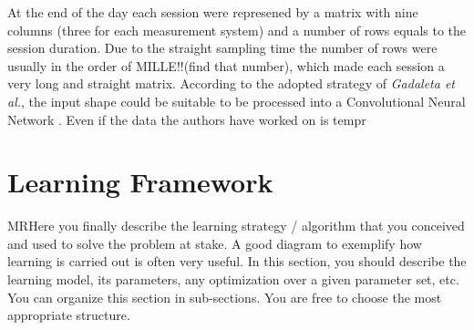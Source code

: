 At the end of the day each session were represened by a matrix with nine columns (three for each measurement system) and a number of rows equals to the session duration. Due to the straight sampling time the number of rows were usually in the order of MILLE!!(find that number), which made each session a very long and straight matrix. According to the adopted strategy of \textit{Gadaleta et al.}, the input shape could be suitable to be processed into a Convolutional Neural Network \cite{Gadaleta-2018}. Even if the data the authors have worked on is tempr

\section{Learning Framework}
\label{sec:learning_framework}

MR{Here you finally describe the learning strategy / algorithm that you conceived and used to solve the problem at stake. A good diagram to exemplify how learning is carried out is often very useful. In this section, you should describe the learning model, its parameters, any optimization over a given parameter set, etc. You can organize this section in \mbox{sub-sections}. You are free to choose the most appropriate structure.}






